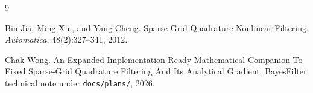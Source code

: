 \documentclass[11pt]{article}
\begin{document}
\begin{thebibliography}{9}

Bin Jia, Ming Xin, and Yang Cheng.
\newblock Sparse-Grid Quadrature Nonlinear Filtering.
\newblock \emph{Automatica}, 48(2):327--341, 2012.

Chak Wong.
\newblock An Expanded Implementation-Ready Mathematical Companion To Fixed
Sparse-Grid Quadrature Filtering And Its Analytical Gradient.
\newblock BayesFilter technical note under \texttt{docs/plans/}, 2026.

\end{thebibliography}
\end{document}
